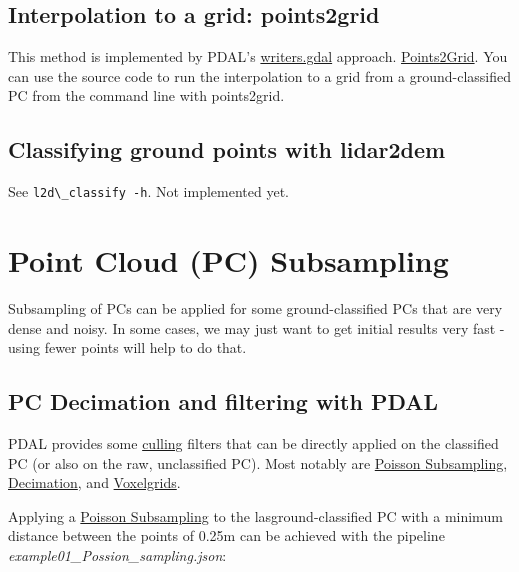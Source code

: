 \documentclass[a4paperpaper,,tablecaptionabove]{scrartcl}
\newcommand{\passthrough}[1]{#1}
\begin{document}
\hypertarget{interpolation-to-a-grid-points2grid}{%
\subsection{Interpolation to a grid:
points2grid}\label{interpolation-to-a-grid-points2grid}}

This method is implemented by PDAL's
\href{https://pdal.io/stages/writers.gdal.html}{writers.gdal} approach.
\href{https://opentopography.org/otsoftware/points2grid}{Points2Grid}.
You can use the source code to run the interpolation to a grid from a
ground-classified PC from the command line with points2grid.

\hypertarget{classifying-ground-points-with-lidar2dem}{%
\subsection{Classifying ground points with
lidar2dem}\label{classifying-ground-points-with-lidar2dem}}

See \passthrough{\lstinline!l2d\_classify -h!}. Not implemented yet.

\hypertarget{point-cloud-pc-subsampling}{%
\section{Point Cloud (PC)
Subsampling}\label{point-cloud-pc-subsampling}}

Subsampling of PCs can be applied for some ground-classified PCs that
are very dense and noisy. In some cases, we may just want to get initial
results very fast - using fewer points will help to do that.

\hypertarget{pc-decimation-and-filtering-with-pdal}{%
\subsection{PC Decimation and filtering with
PDAL}\label{pc-decimation-and-filtering-with-pdal}}

PDAL provides some
\href{https://pdal.io/stages/filters.html\#cull}{culling} filters that
can be directly applied on the classified PC (or also on the raw,
unclassified PC). Most notably are
\href{https://pdal.io/stages/filters.sample.html\#filters-sample}{Poisson
Subsampling},
\href{https://pdal.io/stages/filters.decimation.html\#filters-decimation}{Decimation},
and
\href{https://pdal.io/stages/filters.voxelgrid.html\#filters-voxelgrid}{Voxelgrids}.

Applying a
\href{https://pdal.io/stages/filters.sample.html\#filters-sample}{Poisson
Subsampling} to the lasground-classified PC with a minimum distance
between the points of 0.25m can be achieved with the pipeline
\emph{example01\_Possion\_sampling.json}:
\end{document}

